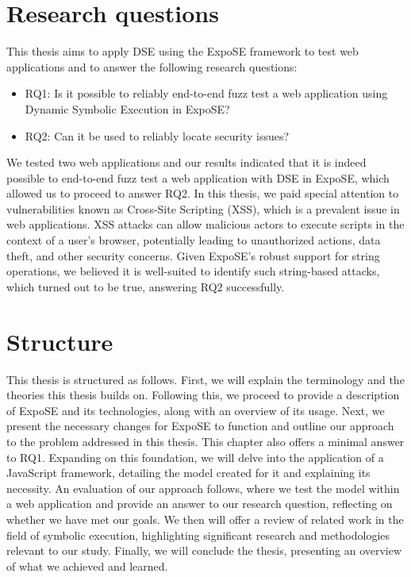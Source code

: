 \newpage

\section{Research questions}
\label{sec:research-questions}

This thesis aims to apply DSE using the ExpoSE framework to test web applications and to answer the following research questions:

\begin{itemize}
    \item RQ1: Is it possible to reliably end-to-end fuzz test a web application using Dynamic Symbolic Execution in ExpoSE?
    \item RQ2: Can it be used to reliably locate security issues?
\end{itemize}

We tested two web applications and our results indicated that it is indeed possible to end-to-end fuzz test a web application with DSE in ExpoSE, which allowed us to proceed to answer RQ2.
In this thesis, we paid special attention to vulnerabilities known as Cross-Site Scripting (XSS), which is a prevalent issue in web applications. XSS attacks can allow malicious actors to execute scripts in the context of a user's browser, potentially leading to unauthorized actions, data theft, and other security concerns. Given ExpoSE's robust support for string operations, we believed it is well-suited to identify such string-based attacks, which turned out to be true, answering RQ2 successfully.

\section{Structure}
\label{sec:thesis-structure}
This thesis is structured as follows. First, we will explain the terminology and the theories this thesis builds on. 
Following this, we proceed to provide a description of ExpoSE and its technologies, along with an overview of its usage.
Next, we present the necessary changes for ExpoSE to function and outline our approach to the problem addressed in this thesis. This chapter also offers a minimal answer to RQ1.
Expanding on this foundation, we will delve into the application of a JavaScript framework, detailing the model created for it and explaining its necessity. 
An evaluation of our approach follows,  where we test the model within a web application and provide an answer to our research question, reflecting on whether we have met our goals.
We then will offer a review of related work in the field of symbolic execution, highlighting significant research and methodologies relevant to our study. 
Finally, we will conclude the thesis, presenting an overview of what we achieved and learned.